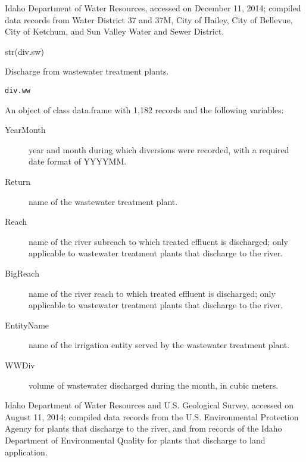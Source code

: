 \documentclass[a4paper]{book}
\begin{document}
%
\begin{Source}\relax
Idaho Department of Water Resources, accessed on December 11, 2014;
compiled data records from Water District 37 and 37M, City of Hailey,
City of Bellevue, City of Ketchum, and Sun Valley Water and Sewer District.
\end{Source}
%
\begin{Examples}
\begin{ExampleCode}
str(div.sw)

\end{ExampleCode}
\end{Examples}
%
\begin{Description}\relax
Discharge from wastewater treatment plants.
\end{Description}
%
\begin{Usage}
\begin{verbatim}
div.ww
\end{verbatim}
\end{Usage}
%
\begin{Format}
An object of class data.frame with 1,182 records and the following variables:
\begin{description}

\item[YearMonth] year and month during which diversions were recorded,
with a required date format of YYYYMM.
\item[Return] name of the wastewater treatment plant.
\item[Reach] name of the river subreach to which treated effluent is discharged;
only applicable to wastewater treatment plants that discharge to the river.
\item[BigReach] name of the river reach to which treated effluent is discharged;
only applicable to wastewater treatment plants that discharge to the river.
\item[EntityName] name of the irrigation entity served by the wastewater treatment plant.
\item[WWDiv] volume of wastewater discharged during the month, in cubic meters.

\end{description}

\end{Format}
%
\begin{Source}\relax
Idaho Department of Water Resources and U.S. Geological Survey,
accessed on August 11, 2014; compiled data records from the
U.S. Environmental Protection Agency for plants that discharge to the river,
and from records of the Idaho Department of Environmental Quality for
plants that discharge to land application.
\end{Source}
\end{document}
